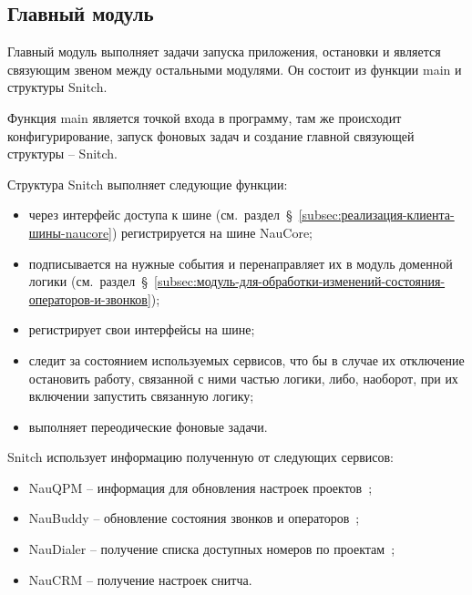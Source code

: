 \subsection{Главный модуль}

Главный модуль выполняет задачи запуска приложения, остановки и является связующим звеном между остальными модулями.
Он состоит из функции main и структуры Snitch.

Функция main является точкой входа в программу, там же происходит конфигурирование, запуск фоновых задач
и создание главной связующей структуры -- Snitch.

Структура Snitch выполняет следующие функции:
\begin{itemize}
    \item через интерфейс доступа к шине (см.~раздел~\S~\ref{subsec:реализация-клиента-шины-naucore})
    регистрируется на шине NauCore;
    \item подписывается на нужные события
    и перенаправляет их в модуль доменной логики (см.~раздел~\S~\ref{subsec:модуль-для-обработки-изменений-состояния-операторов-и-звонков});
    \item регистрирует свои интерфейсы на шине;
    \item следит за состоянием используемых сервисов, что бы в случае их отключение остановить работу, связанной с ними частью логики,
    либо, наоборот, при их включении запустить связанную логику;
    \item выполняет переодические фоновые задачи.
\end{itemize}

Snitch использует информацию полученную от следующих сервисов:
\begin{itemize}
    \item NauQPM -- информация для обновления настроек проектов~\cite{doc:qpm};
    \item NauBuddy -- обновление состояния звонков и операторов~\cite{doc:buddy};
    \item NauDialer -- получение списка доступных номеров по проектам~\cite{doc:dialer};
    \item NauCRM -- получение настроек снитча.
\end{itemize}

